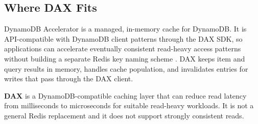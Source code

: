 \subsection{Where DAX Fits}
DynamoDB Accelerator is a managed, in-memory cache for DynamoDB. It is API-compatible with DynamoDB client patterns through the DAX SDK, so applications can accelerate eventually consistent read-heavy access patterns without building a separate Redis key naming scheme \cite{awsDynamoDBDAX}. DAX keeps item and query results in memory, handles cache population, and invalidates entries for writes that pass through the DAX client.
\begin{definitionbox}
\textbf{DAX} is a DynamoDB-compatible caching layer that can reduce read latency from milliseconds to microseconds for suitable read-heavy workloads. It is not a general Redis replacement and it does not support strongly consistent reads.
\end{definitionbox}
